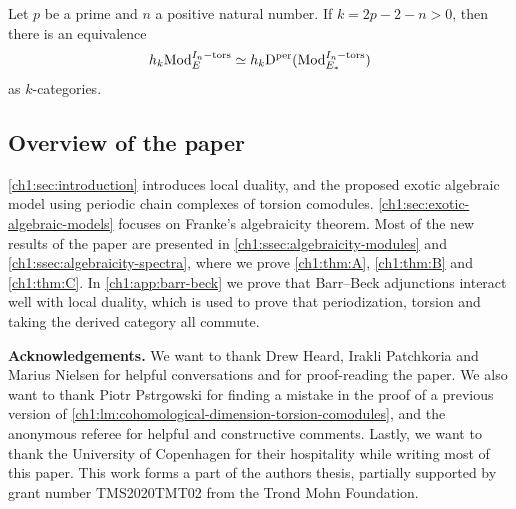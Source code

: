 \begin{introthm}
    \label{ch1:thm:C}
    Let $p$ be a prime and $n$ a positive natural number. If $k=2p-2-n>0$,  then there is an equivalence
    \[h_k \mathrm{Mod}_{E}^{I_n-\mathrm{tors}}\simeq h_k \mathrm{D}^{\mathrm{per}}(\mathrm{Mod}_{E_*}^{I_n-\mathrm{tors}})\]
    as $k$-categories.
\end{introthm}


\subsection*{Overview of the paper}

\cref{ch1:sec:introduction} introduces local duality, and the proposed exotic algebraic model using periodic chain complexes of torsion comodules. \cref{ch1:sec:exotic-algebraic-models} focuses on Franke's algebraicity theorem. Most of the new results of the paper are presented in \cref{ch1:ssec:algebraicity-modules} and \cref{ch1:ssec:algebraicity-spectra}, where we prove \cref{ch1:thm:A}, \cref{ch1:thm:B} and \cref{ch1:thm:C}. In \cref{ch1:app:barr-beck} we prove that Barr--Beck adjunctions interact well with local duality, which is used to prove that periodization, torsion and taking the derived category all commute. 


\textbf{Acknowledgements.} We want to thank Drew Heard, Irakli Patchkoria and Marius Nielsen for helpful conversations and for proof-reading the paper. We also want to thank Piotr Pstr\a{}gowski for finding a mistake in the proof of a previous version of \cref{ch1:lm:cohomological-dimension-torsion-comodules}, and the anonymous referee for helpful and constructive comments. Lastly, we want to thank the University of Copenhagen for their hospitality while writing most of this paper. This work forms a part of the authors thesis, partially supported by grant number TMS2020TMT02 from the Trond Mohn Foundation. 